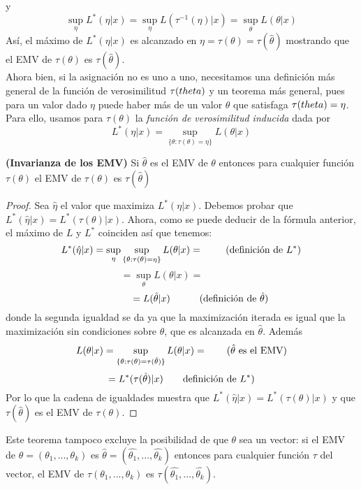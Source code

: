 y
\[ \sup_{\eta}L^{*}(\eta \vert x) = \sup_{\eta}L(\tau^{-1}(\eta) \vert x) = \sup_{\theta}L(\theta \vert x) \]
Así, el máximo de $L^{*}(\eta \vert x) $ es alcanzado en $\eta = \tau(\theta) = \tau(\hat{\theta})$ mostrando que el EMV de $\tau(\theta)$ es $\tau(\hat{\theta})$.\\
Ahora bien, si la asignación no es uno a uno, necesitamos una definición más general de  la función de verosimilitud $\tau(\\theta)$ y un teorema más general, pues para un valor dado $\eta$ puede haber más de un valor $\theta$ que satisfaga $\tau(\\theta) = \eta$.\\
Para ello, usamos para $\tau(\theta)$ la \textit{función de verosimilitud inducida} dada por \[ L^{*}(\eta \vert x) = \sup_{\lbrace \theta:\tau(\theta)=\eta \rbrace} L(\theta \vert x) \]
\begin{teorema}
\textbf{(Invarianza de los EMV)} Si $\hat{\theta}$ es el EMV de $\theta$  entonces para cualquier función $\tau(\theta)$ el EMV de $\tau(\theta)$ es $\tau(\hat{\theta})$
\end{teorema}
\begin{proof}
Sea $\hat{\eta}$ el valor que maximiza $L^{*}(\eta \vert x)$. Debemos probar que $L^{*}(\hat{\eta} \vert x) = L^{*}(\tau(\theta) \vert x)$. Ahora, como se puede deducir de la fórmula anterior, el máximo de $L$ y $L^{*}$ coinciden así que tenemos: 
\[ L^{*}(\hat{\eta} \vert x) = \sup_{\eta} \sup_{\lbrace \theta:\tau(\theta)=\eta \rbrace} L(\theta \vert x)= \quad \quad \textnormal{ (definición de } L^{*} \textnormal{)} \]
\[ =\sup_{\theta}L(\theta \vert x) = \quad \quad \quad \quad \]
\[\quad \quad \quad \quad  = L(\hat{\theta} \vert x) \quad \quad \quad \textnormal{(definición de } \hat{\theta} \textnormal{)} \]
donde la segunda igualdad se da ya que la maximización iterada es igual que la maximización sin condiciones sobre $\theta$, que es alcanzada en $\hat{\theta}$. Además
\[ L(\theta \vert x) = \sup_{\lbrace \theta:\tau(\theta)=\tau(\hat{\theta}) \rbrace} L(\theta \vert x)= \quad \quad \textnormal{(} \hat{\theta} \textnormal{ es el EMV)} \]
\[ =L^{*}(\tau(\hat{\theta}) \vert x) \quad \quad \textnormal{definición de } L^{*} \textnormal{)} \]
Por lo que la cadena de igualdades muestra que $L^{*}(\hat{\eta} \vert x) = L^{*}(\tau(\theta) \vert x)$ y que $\tau(\hat{\theta})$ es el EMV de $\tau(\theta)$.
\end{proof}
Este teorema tampoco excluye la posibilidad de que $\theta$ sea un vector: si el EMV de $\theta=(\theta_{1},...,\theta_{k})$ es $\hat{\theta}=(\hat{\theta_{1}},...,\hat{\theta_{k}})$ entonces para cualquier función $\tau$ del vector, el EMV de $\tau(\theta_{1},...,\theta_{k})$ es $\tau(\hat{\theta_{1}},...,\hat{\theta_{k}})$.
\endinput
